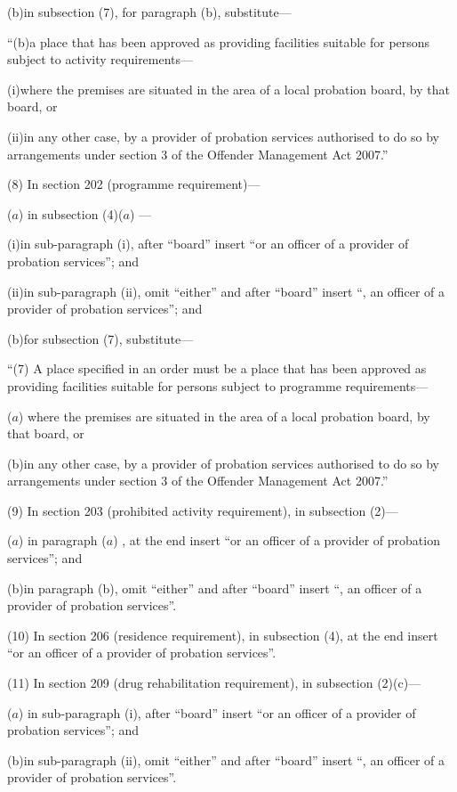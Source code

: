 \documentclass[12pt,a4paper]{article}
\begin{document}
(b)in subsection (7), for paragraph (b), substitute—

“(b)a place that has been approved as providing facilities suitable for persons subject to activity requirements—

(i)where the premises are situated in the area of a local probation board, by that board, or

(ii)in any other case, by a provider of probation services authorised to do so by arrangements under section 3 of the Offender Management Act 2007.”

(8) In section 202 (programme requirement)—

($a$) in subsection (4)($a$) —

(i)in sub-paragraph (i), after “board” insert “or an officer of a provider of probation services”; and

(ii)in sub-paragraph (ii), omit “either” and after “board” insert “, an officer of a provider of probation services”; and

(b)for subsection (7), substitute—

“(7) A place specified in an order must be a place that has been approved as providing facilities suitable for persons subject to programme requirements—

($a$) where the premises are situated in the area of a local probation board, by that board, or

(b)in any other case, by a provider of probation services authorised to do so by arrangements under section 3 of the Offender Management Act 2007.”

(9) In section 203 (prohibited activity requirement), in subsection (2)—

($a$) in paragraph ($a$) , at the end insert “or an officer of a provider of probation services”; and

(b)in paragraph (b), omit “either” and after “board” insert “, an officer of a provider of probation services”.

(10) In section 206 (residence requirement), in subsection (4), at the end insert “or an officer of a provider of probation services”.

(11) In section 209 (drug rehabilitation requirement), in subsection (2)(c)—

($a$) in sub-paragraph (i), after “board” insert “or an officer of a provider of probation services”; and

(b)in sub-paragraph (ii), omit “either” and after “board” insert “, an officer of a provider of probation services”.
\end{document}
